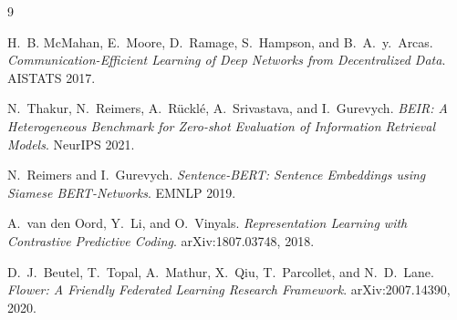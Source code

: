 \documentclass[12pt,a4paper]{article}
\begin{document}
\begin{thebibliography}{9}

  H.~B. McMahan, E.~Moore, D.~Ramage, S.~Hampson, and B.~A.~y.~Arcas.
  \textit{Communication-Efficient Learning of Deep Networks from Decentralized Data}.
  AISTATS 2017.

  N.~Thakur, N.~Reimers, A.~Rücklé, A.~Srivastava, and I.~Gurevych.
  \textit{BEIR: A Heterogeneous Benchmark for Zero-shot Evaluation of Information Retrieval Models}.
  NeurIPS 2021.

  N.~Reimers and I.~Gurevych.
  \textit{Sentence-BERT: Sentence Embeddings using Siamese BERT-Networks}.
  EMNLP 2019.

  A.~van den Oord, Y.~Li, and O.~Vinyals.
  \textit{Representation Learning with Contrastive Predictive Coding}.
  arXiv:1807.03748, 2018.

  D.~J.~Beutel, T.~Topal, A.~Mathur, X.~Qiu, T.~Parcollet, and N.~D.~Lane.
  \textit{Flower: A Friendly Federated Learning Research Framework}.
  arXiv:2007.14390, 2020.

\end{thebibliography}
\end{document}
